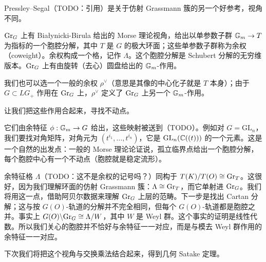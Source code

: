 Pressley–Segal（TODO：引用）是关于仿射 Grassmann 簇的另一个好参考，视角不同。

$\mathrm{Gr}_G$ 上有 Białynicki-Birula 给出的 Morse 理论视角，给出以单参数子群 $\mathbb{G}_m\to T$ 为指标的一个胞腔分解，其中 $T$ 是 $G$ 的极大环面；这些单参数子群称为余权（coweight）。余权构成一个格，记作 $\Lambda$。这个胞腔分解是 Schubert 分解的无穷维版本。$\mathrm{Gr}_G$ 上有由旋转（去心）圆盘给出的 $\mathbb{G}_m$-作用。

我们也可以选一个一般的余权 $\rho^\vee$（意思是其像的中心化子就是 $T$ 本身）；由于 $G\subset LG_+$ 作用在 $\mathrm{Gr}_G$ 上，$\rho^\vee$ 定义了 $\mathrm{Gr}_G$ 上另一个 $\mathbb{G}_m$-作用。

让我们把这些作用合起来，寻找不动点。

它们由余特征 $\phi:\mathbb{G}_m\to G$ 给出，这些映射被送到（TODO）。例如对 $G=\mathrm{GL}_n$，我们要找对角矩阵，对角元为 $(t^{i_1},\dots,t^{i_n})$，它是 $\mathrm{GL}_n(\mathbb{C}((t)))$ 的一个元素。这是一个自然的出发点：一般的 Morse 理论论证说，孤立临界点给出一个胞腔分解，每个胞腔中心有一个不动点（胞腔就是稳定流形）。

余特征格 $\Lambda$（TODO：这不是余权的记号吗？）同构于 $T(K)/T(O)\cong\mathrm{Gr}_T$。这很好，因为我们理解环面的仿射 Grassmann 簇：$\Lambda\cong\mathrm{Gr}_T$，而它单射进 $\mathrm{Gr}_G$。我们将用这一点，借助阿贝尔数据来理解 $\mathrm{Gr}_G$ 上层的范畴。下一步是找出 Cartan 分解；这与按 $G(O)$-轨道的分解并不完全相同，但每个 $G(O)$-轨道都是胞腔之并。事实上 $G(O)\backslash\mathrm{Gr}_G\cong\Lambda/W$，其中 $W$ 是 Weyl 群。这个事实的证明是线性代数。所以我们关心的胞腔并不恰好与余特征一一对应，而是与模去 Weyl 群作用的余特征一一对应。

下次我们将把这个视角与交换乘法结合起来，得到几何 Satake 定理。


